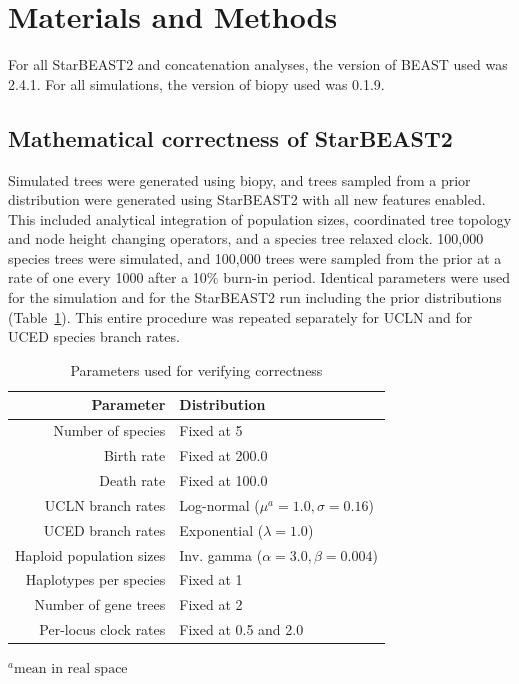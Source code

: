 \documentclass[nogrid]{MBE}%
\begin{document}
\section{Materials and Methods}

For all StarBEAST2 and concatenation analyses, the version of BEAST used was
2.4.1. For all simulations, the version of biopy \citep{biopy} used was 0.1.9.

\subsection{Mathematical correctness of StarBEAST2}

Simulated trees were generated using biopy, and trees sampled from a prior
distribution were generated using StarBEAST2 with all new features enabled. This
included analytical integration of population sizes, coordinated tree topology
and node height changing operators, and a species tree relaxed clock. 100,000
species trees were simulated, and 100,000 trees were sampled from the prior at a
rate of one every 1000 after a 10\% burn-in period. Identical parameters were
used for the simulation and for the StarBEAST2 run including the prior
distributions (Table~\ref{tab:correctParameters}). This entire procedure was
repeated separately for UCLN and for UCED species branch rates.

\begin{table}[htb!]
\centering
\caption{Parameters used for verifying correctness}
\label{tab:correctParameters}
\begin{threeparttable}
\begin{adjustbox}{center}
\small
\begin{tabular}{rl}
\hline
Parameter & Distribution\tabularnewline
\hline
Number of species & Fixed at 5\tabularnewline
Birth rate & Fixed at 200.0\tabularnewline
Death rate & Fixed at 100.0\tabularnewline
UCLN branch rates & Log-normal ($\mu^a = 1.0, \sigma = 0.16$)\tabularnewline
UCED branch rates & Exponential ($\lambda = 1.0$)\tabularnewline
Haploid population sizes & Inv. gamma ($\alpha = 3.0, \beta = 0.004$)\tabularnewline
Haplotypes per species & Fixed at 1\tabularnewline
Number of gene trees & Fixed at 2\tabularnewline
Per-locus clock rates & Fixed at 0.5 and 2.0\tabularnewline
\hline
\end{tabular}
\end{adjustbox}
\begin{tablenotes}
\item ${}^a\text{mean in real space}$
\end{tablenotes}
\end{threeparttable}
\end{table}
\end{document}
